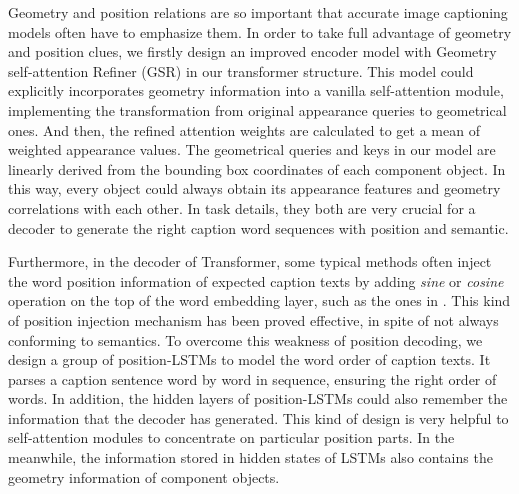 \documentclass[review]{elsarticle}
\begin{document}
%

Geometry and position relations are so important that accurate image captioning models often have to emphasize them. In order to take full advantage of geometry and position clues, we firstly design an improved encoder model with {Geometry self-attention Refiner} (GSR) in our transformer structure. This model could explicitly incorporates geometry information into a vanilla self-attention module, implementing the transformation from original appearance queries to geometrical ones. And then, the refined attention weights are calculated to get a mean of weighted appearance values. The geometrical queries and keys in our model are linearly derived from the bounding box coordinates of each component object. In this way, every object could always obtain its appearance features and geometry correlations with each other. In task details, they both are very crucial for a decoder to generate the right caption word sequences with position and semantic.


Furthermore, in the decoder of Transformer, some typical methods often inject the word position information of expected caption texts by adding \emph{sine} or \emph{cosine} operation on the top of the word embedding layer, such as the ones in \cite{vaswani2017attention, herdade2019image}. This kind of position injection mechanism has been proved effective, in spite of not always conforming to semantics. To overcome this weakness of position decoding, we design a group of position-LSTMs to model the word order of caption texts. It parses a caption sentence word by word in sequence, ensuring the right order of words. In addition, the hidden layers of position-LSTMs could also remember the information that the decoder has generated. This kind of design is very helpful to self-attention modules to concentrate on particular position parts. In the meanwhile, the information stored in hidden states of LSTMs also contains the geometry information of component objects.
\end{document}
